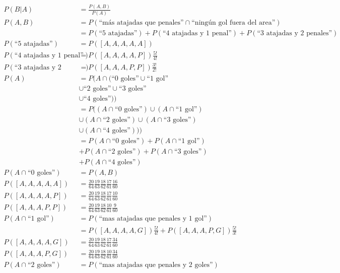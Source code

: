 \documentclass[12pt]{article}
\begin{document}
\begin{align*}
    P(B|A)&=\frac{P(A,B)}{P(A)}\\
    P(A,B)&=P(\text{``más atajadas que penales''}\cap\text{``ningún gol fuera del area''})\\
          &=P(\text{``5 atajadas''})+P(\text{``4 atajadas y 1 penal''})+P(\text{``3 atajadas y 2 penales''})\\
    P(\text{``5 atajadas''})&=P([A,A,A,A,A])\\
    P(\text{``4 atajadas y 1 penal''})&=P([A,A,A,A,P])\frac{5!}{4!}\\
    P(\text{``3 atajadas y 2 penales''})&=P([A,A,A,P,P])\frac{3!}{2!}\\
    P(A)&=P(A\cap(\text{``0 goles''}\cup\text{``1 gol''}\\
        &\cup\text{``2 goles''}\cup\text{``3 goles''}\\
        &\cup\text{``4 goles''}))\\
        &=P((A\cap\text{``0 goles''})\cup(A\cap\text{``1 gol''})\\
        &\cup(A\cap\text{``2 goles''})\cup(A\cap\text{``3 goles''})\\
        &\cup(A\cap\text{``4 goles''})))\\
        &=P(A\cap\text{``0 goles''})+P(A\cap\text{``1 gol''})\\
        &+P(A\cap\text{``2 goles''})+P(A\cap\text{``3 goles''})\\
        &+P(A\cap\text{``4 goles''})\\
    P(A\cap\text{``0 goles''})&=P(A,B)\\
    P([A,A,A,A,A])&=\frac{20}{64}\frac{19}{63}\frac{18}{62}\frac{17}{61}\frac{16}{60}\\
    P([A,A,A,A,P])&=\frac{20}{64}\frac{19}{63}\frac{18}{62}\frac{17}{61}\frac{10}{60}\\
    P([A,A,A,P,P])&=\frac{20}{64}\frac{19}{63}\frac{18}{62}\frac{10}{61}\frac{9}{60}\\
    P(A\cap\text{``1 gol''})&=P(\text{``mas atajadas que penales y 1 gol''})\\
                              &=P([A,A,A,A,G])\frac{5!}{4!}+P([A,A,A,P,G])\frac{5!}{3!}\\
    P([A,A,A,A,G])&=\frac{20}{64}\frac{19}{63}\frac{18}{62}\frac{17}{61}\frac{34}{60}\\
    P([A,A,A,P,G])&=\frac{20}{64}\frac{19}{63}\frac{18}{62}\frac{10}{61}\frac{34}{60}\\
    P(A\cap\text{``2 goles''})&=P(\text{``mas atajadas que penales y 2 goles''})\\

\end{align*}
\end{document}
